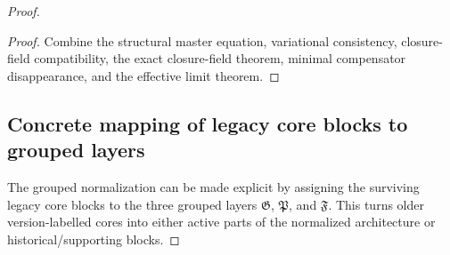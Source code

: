 \begin{proof}
\begin{proof}
Combine the structural master equation, variational consistency, closure-field compatibility, the exact closure-field theorem, minimal compensator disappearance, and the effective limit theorem.
\end{proof}

\subsection*{Concrete mapping of legacy core blocks to grouped layers}

The grouped normalization can be made explicit by assigning the surviving legacy
core blocks to the three grouped layers $\mathfrak G$, $\mathfrak P$, and
$\mathfrak F$. This turns older version-labelled cores into either active parts
of the normalized architecture or historical/supporting blocks.


\end{proof}
